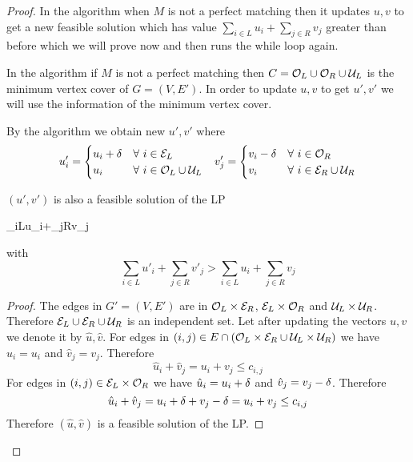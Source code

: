 \documentclass[twoside]{article}
\begin{document}
\begin{proof}
	In the algorithm when $M$ is not a perfect matching then it updates $u,v$ to get a new feasible solution which has value $\sum\limits_{i\in L}u_i+\sum\limits_{j\in R}v_j$ greater than before which we will prove now and then runs the while loop again.
	
	In the  algorithm if $M$ is not a perfect matching then $C=\mathcal{O}_L\cup \mathcal{O}_R\cup\mathcal{U}_L$ is the minimum vertex cover of $G=(V,E')$. In order to update $u,v$ to get $u',v'$ we will use the information of the minimum vertex cover. 
	
	By the algorithm we obtain new $u',v'$ where \begin{align*}
		u'_i=\begin{cases}
			u_i+\delta & \forall\ i\in \mathcal{E}_L\\
			u_i & \forall\ i\in \mathcal{O}_L\cup \mathcal{U}_L
		\end{cases}  && v'_j=\begin{cases}
			v_i-\delta & \forall\ i\in \mathcal{O}_R\\
			v_i & \forall\ i\in \mathcal{E}_R\cup \mathcal{U}_R
		\end{cases} 
	\end{align*}
	\begin{claimwidth}
		\begin{claim}{}{}
			$(u',v')$ is also a feasible solution of the LP \begin{maxi*}{}{\sum_{i\in L}u_i+\sum_{j\in R}v_j}{}{}
			\end{maxi*} with $$\sum\limits_{i\in L}u'_i+\sum\limits_{j\in R}v'_j> \sum\limits_{i\in L}u_i+\sum\limits_{j\in R}v_j$$
		\end{claim}
		\begin{proof}
			The edges in $G'=(V,E')$ are in $\mathcal{O}_L\times \mathcal{E}_R$, $\mathcal{E}_L\times \mathcal{O}_R$ and $\mathcal{U}_L\times \mathcal{U}_R$. Therefore $\mathcal{E}_L\cup \mathcal{E}_R\cup \mathcal{U}_R$ is an independent set. Let after updating the vectors $u,v$ we denote it by $\hat{u},\hat{v}$. For edges in $(i,j)\in E\cap (\mathcal{O}_L\times\mathcal{E}_R \cup   \mathcal{U}_L\times \mathcal{U}_R)$ we have $\hat{u}_i=u_i$ and $\hat{v}_j=v_j$. Therefore  $$\hat{u}_i+\hat{v}_j=u_i+v_j\leq c_{i,j}$$For edges in $(i,j)\in  \mathcal{E}_L\times \mathcal{O}_R$ we have $\hat{u}_i=u_i+\delta$ and $\hat{v}_j=v_j-\delta$. Therefore  $$\hat{u}_i+\hat{v}_j=u_i+\delta+v_j-\delta=u_i+v_j\leq c_{i,j}$$Therefore $(\hat{u},\hat{v})$ is a feasible solution of the LP. 
			

\end{proof}
\end{claimwidth}
\end{proof}
\end{document}
